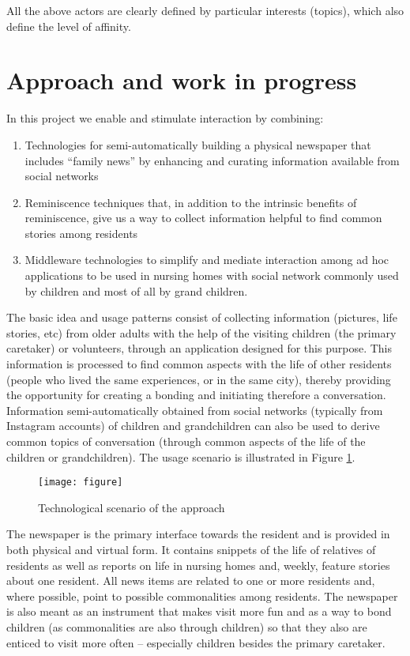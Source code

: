 \documentclass[runningheads,a4paper,oribibl]{llncs}
\begin{document}
All the above actors are clearly defined by particular interests (topics), which also define the level of affinity. 

\section{Approach and work in progress}
In this project we enable and stimulate interaction by combining: 
\begin{enumerate}
\item	Technologies for semi-automatically building a physical newspaper that includes “family news” by enhancing and curating information available from social networks
\item	Reminiscence techniques that, in addition to the intrinsic benefits of reminiscence, give us a way to collect information helpful to find common stories among residents
\item	Middleware technologies to simplify and mediate interaction among ad hoc applications to be used in nursing homes with social network commonly used by children and most of all by grand children. 
\end{enumerate}


The basic idea and usage patterns consist of collecting information (pictures, life stories, etc) from older adults with the help of the visiting children (the primary caretaker) or volunteers, through an application designed for this purpose. This information is processed to find common aspects with the life of other residents (people who lived the same experiences, or in the same city), thereby providing the opportunity for creating a bonding and initiating therefore a conversation. Information semi-automatically obtained from social networks (typically from Instagram accounts) of children and grandchildren can also be used to derive common topics of conversation (through common aspects of the life of the children or grandchildren). The usage scenario is illustrated in Figure \ref{fig:architecture}.

\begin{figure}[t!]
\centering
\texttt{[image: figure]}
\caption{Technological scenario of the approach}
\label{fig:architecture}
\end{figure}

The newspaper is the primary interface towards the resident and is provided in both physical and virtual form. It contains snippets of the life of relatives of residents as well as reports on life in nursing homes and, weekly, feature stories about one resident.
All news items are related to one or more residents and, where possible, point to possible commonalities among residents. 
The newspaper is also meant as an instrument that makes visit more fun and as a way to bond children (as commonalities are also through children) so that they also are enticed to visit more often – especially children besides the primary caretaker. 
\end{document}
